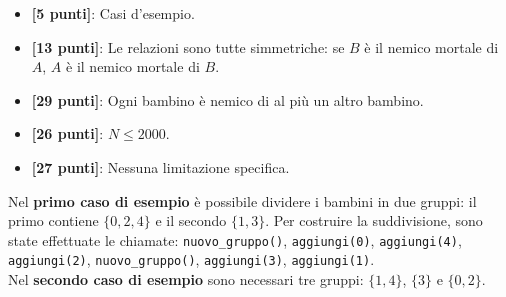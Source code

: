 \begin{itemize}[nolistsep,itemsep=2mm]
  \item \textbf{ [\phantom{0}5 punti]}: Casi d'esempio.
  \item \textbf{ [13 punti]}: Le relazioni sono tutte simmetriche: se $B$ è il nemico mortale di $A$, $A$ è il nemico mortale di $B$.
  \item \textbf{ [29 punti]}: Ogni bambino è nemico di al più un altro bambino.
  \item \textbf{ [26 punti]}: $N \le 2000$.
  \item \textbf{ [27 punti]}: Nessuna limitazione specifica.
\end{itemize}




\Examples

\begin{example}
%
%
\end{example}



\Explanation

Nel \textbf{primo caso di esempio} è possibile dividere i bambini in due gruppi: il primo contiene $\{0,2,4\}$ e il secondo $\{1,3\}$. Per costruire la suddivisione, sono state effettuate le chiamate: \verb|nuovo_gruppo()|, \verb|aggiungi(0)|, \verb|aggiungi(4)|, \verb|aggiungi(2)|, \verb|nuovo_gruppo()|, \verb|aggiungi(3)|, \verb|aggiungi(1)|.\\[2mm]

Nel \textbf{secondo caso di esempio} sono necessari tre gruppi: $\{1, 4\}$, $\{3\}$ e $\{0, 2\}$.
